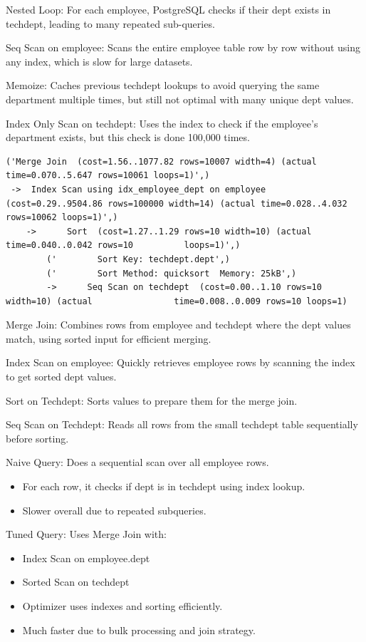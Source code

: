 \documentclass[11pt]{scrartcl}
\begin{document}
Nested Loop: For each employee, PostgreSQL checks if their dept exists in techdept, leading to many repeated sub-queries.

Seq Scan on employee: Scans the entire employee table row by row without using any index, which is slow for large datasets.

Memoize: Caches previous techdept lookups to avoid querying the same department multiple times, but still not optimal with many unique dept values.

Index Only Scan on techdept: Uses the index to check if the employee’s department exists, but this check is done 100,000 times.

{\small
\parskip0pt\begin{verbatim}
('Merge Join  (cost=1.56..1077.82 rows=10007 width=4) (actual time=0.070..5.647 rows=10061 loops=1)',)
 ->  Index Scan using idx_employee_dept on employee  (cost=0.29..9504.86 rows=100000 width=14) (actual time=0.028..4.032 rows=10062 loops=1)',)
	->  	Sort  (cost=1.27..1.29 rows=10 width=10) (actual time=0.040..0.042 rows=10 	      	loops=1)',)
		('        Sort Key: techdept.dept',)
		('        Sort Method: quicksort  Memory: 25kB',)
		->  	Seq Scan on techdept  (cost=0.00..1.10 rows=10 width=10) (actual 				time=0.008..0.009 rows=10 loops=1)
\end{verbatim}}

Merge Join: Combines rows from employee and techdept where the dept values match, using sorted input for efficient merging.

Index Scan on employee: Quickly retrieves employee rows by scanning the index to get sorted dept values.

Sort on Techdept: Sorts values to prepare them for the merge join.

Seq Scan on Techdept: Reads all rows from the small techdept table sequentially before sorting.

Naive Query: Does a sequential scan over all employee rows.

\begin{itemize}
\item For each row, it checks if dept is in techdept using index lookup.
\item Slower overall due to repeated subqueries.
\end{itemize}

Tuned Query: Uses Merge Join with:
\begin{itemize}
\item Index Scan on employee.dept
\item Sorted Scan on techdept
\item Optimizer uses indexes and sorting efficiently.
\item Much faster due to bulk processing and join strategy.
\end{itemize}
\end{document}
